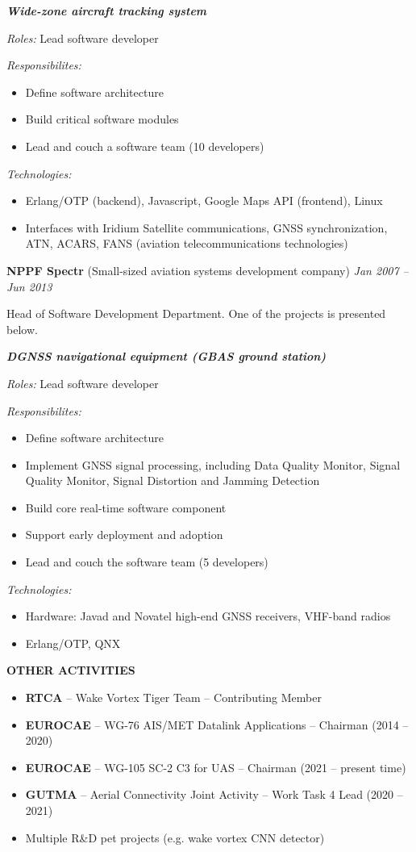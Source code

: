 \documentclass[a4paper]{article}
\newcommand{\project}[4]{

	\textbf{\textit{#1}}
    \vspace{2mm}

    \textit{Roles:} #2
    \vspace{2mm}

    \textit{Responsibilites:}
	\begin{itemize}
	    \setlength{\itemindent}{.5cm}
	    #3
    \end{itemize}
    
	\textit{Technologies:}
	\begin{itemize}
		\setlength{\itemindent}{.5cm}
		#4
	\end{itemize}
}
\begin{document}
	\project{Wide-zone aircraft tracking system}{
		Lead software developer
	}{
		\item Define software architecture
		\item Build critical software modules
		\item Lead and couch a software team (10 developers)
	}{
		\item Erlang/OTP (backend), Javascript, Google Maps API (frontend), Linux
		\item Interfaces with Iridium Satellite communications, GNSS synchronization, ATN, ACARS, FANS (aviation telecommunications technologies)
	}
    
    \vspace{3mm}
    \textbf{NPPF Spectr} (Small-sized aviation systems development company) \hfill \textit{Jan 2007 -- Jun 2013}

    \vspace{2mm}
	Head of Software Development Department. One of the projects is presented below.\\
    \vspace{2mm}

	\project{DGNSS navigational equipment (GBAS ground station)}{
		Lead software developer
	}{
		\item Define software architecture
		\item Implement GNSS signal processing, including Data Quality Monitor, Signal Quality Monitor, Signal Distortion and Jamming Detection
		\item Build core real-time software component
		\item Support early deployment and adoption
		\item Lead and couch the software team (5 developers)
	}{
		\item Hardware: Javad and Novatel high-end GNSS receivers, VHF-band radios
		\item Erlang/OTP, QNX
	}
    
    \vspace{3mm}
    \textbf{OTHER ACTIVITIES}
    \vspace{3mm}

	\begin{itemize}
	    \setlength{\itemindent}{.5cm}	
	    \item \textbf{RTCA} -- Wake Vortex Tiger Team -- Contributing Member
	    \item \textbf{EUROCAE} -- WG-76 AIS/MET Datalink Applications -- Chairman (2014 -- 2020)
	    \item \textbf{EUROCAE} -- WG-105 SC-2 C3 for UAS -- Chairman (2021 -- present time)
	    \item \textbf{GUTMA} -- Aerial Connectivity Joint Activity -- Work Task 4 Lead (2020 -- 2021)
	    \item Multiple R\&D pet projects (e.g. wake vortex CNN detector)
    \end{itemize}
    \vspace{3mm}
    
\end{document}
